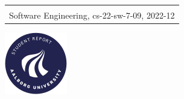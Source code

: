 \begin{titlepage}
{{\begin{tabular}{@{}p{\textwidth}@{}}
\begin{center}
    \end{center}
    \vspace{0.2cm}
   \begin{center}
    {\Large
      Christian Bager Bach Houmann, Daniel Overvad Nykjær, Ivik Lau Dalgas Hostrup, Marco Klaustrup Justesen, Patrick Frostholm Østergaard, Rasmus Høyer Hansen %
    }\\
    \vspace{0.2cm}
    {\large
      Software Engineering, cs-22-sw-7-09, 2022-12%
    }
   \end{center}
   \vspace{0.2cm}
   \begin{center}
    {\Large
      7th semester
    }
   \end{center}
  \end{tabular}}}
  \vfill
  \begin{center}
    \includegraphics[width=0.2\paperwidth]{AAUgraphics/aau_logo_circle_en}%
  \end{center}
\end{titlepage}
\clearpage
